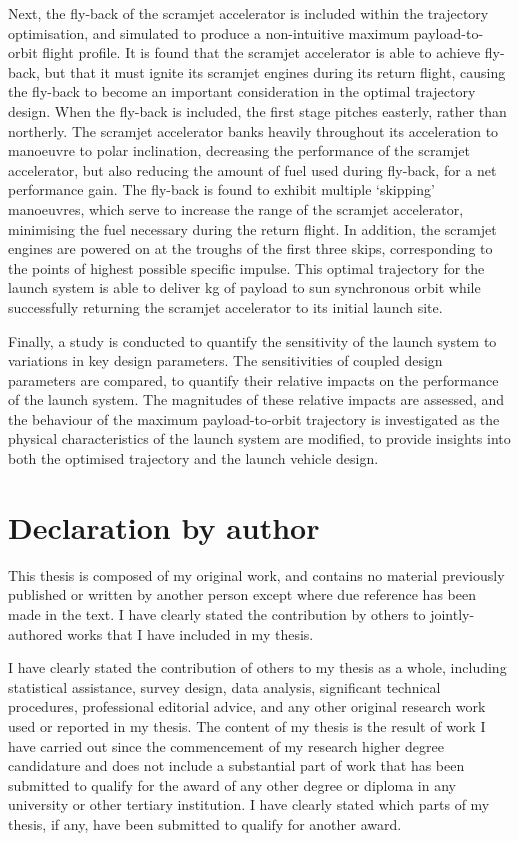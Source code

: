 
 Next, the fly-back of the scramjet accelerator is included within the trajectory optimisation, and simulated to produce a non-intuitive maximum payload-to-orbit flight profile. 
 It is found that the scramjet accelerator is able to achieve fly-back, but that it must ignite its scramjet engines during its return flight, causing the fly-back to become an important consideration in the optimal trajectory design. When the fly-back is included, the first stage pitches easterly, rather than northerly. The scramjet accelerator banks heavily throughout its acceleration to manoeuvre to polar inclination, decreasing the performance of the scramjet accelerator, but also reducing the amount of fuel used during fly-back, for a net performance gain. 
The fly-back is found to exhibit multiple `skipping' manoeuvres, which serve to increase the range of the scramjet accelerator, minimising the fuel necessary during the return flight. In addition, the scramjet engines are powered on at the troughs of the first three skips, corresponding to the points of highest possible specific impulse. This optimal trajectory for the launch system is able to deliver \PayloadToOrbitStandard kg of payload to sun synchronous orbit while successfully returning the scramjet accelerator to its initial launch site.  

Finally, a study is conducted to quantify the sensitivity of the launch system to variations in key design parameters. 
The sensitivities of coupled design parameters are compared, to quantify their relative impacts on the performance of the launch system. The magnitudes of these relative impacts are assessed, and the behaviour of the maximum payload-to-orbit trajectory is investigated as the physical characteristics of the launch system are modified, to provide insights into both the optimised trajectory and the launch vehicle design. 

 

\clearpage
\section*{Declaration by author}

  This thesis is composed of my original work, and contains no material previously published or written by another person except where due reference has been made in the text. I have clearly stated the contribution by others to jointly-authored works that I have included in my thesis.

  I have clearly stated the contribution of others to my thesis as a whole, including statistical assistance, survey design, data analysis, significant technical procedures, professional editorial advice, and any other original research work used or reported in my thesis. The content of my thesis is the result of work I have carried out since the commencement of my research higher degree candidature and does not include a substantial part of work that has been submitted to qualify for the award of any other degree or diploma in any university or other tertiary institution. I have clearly stated which parts of my thesis, if any, have been submitted to qualify for another award.

